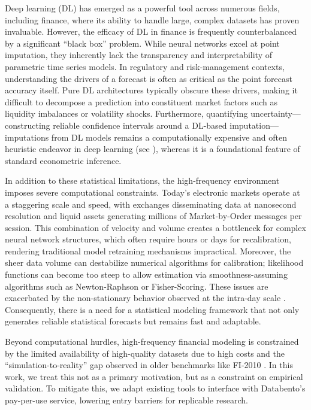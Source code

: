 \documentclass[10pt,a4paper,oneside]{article}
\providecommand{\DIFaddtex}[1]{{\protect\color{blue} \sf #1}} %
\providecommand{\DIFdeltex}[1]{{\protect\color{red} \scriptsize #1}} %
\providecommand{\DIFaddbegin}{} %
\providecommand{\DIFaddend}{} %
\providecommand{\DIFdelbegin}{} %
\providecommand{\DIFdelend}{} %
\providecommand{\DIFadd}[1]{\texorpdfstring{\DIFaddtex{#1}}{#1}} %
\providecommand{\DIFdel}[1]{\texorpdfstring{\DIFdeltex{#1}}{}} %
\newcommand{\DIFscaledelfig}{0.5}
\newlength{\DIFdelgraphicswidth} %
\newlength{\DIFdelgraphicsheight} %
\newcommand{\DIFaddincludegraphics}[2][]{{\color{blue}\fbox{\DIFOincludegraphics[#1]{#2}}}} %
\newcommand{\DIFdelincludegraphics}[2][]{%
\sbox{\DIFdelgraphicsbox}{\DIFOincludegraphics[#1]{#2}}%
\settoboxwidth{\DIFdelgraphicswidth}{\DIFdelgraphicsbox} %
\settoboxtotalheight{\DIFdelgraphicsheight}{\DIFdelgraphicsbox} %
\scalebox{\DIFscaledelfig}{%
\parbox[b]{\DIFdelgraphicswidth}{\usebox{\DIFdelgraphicsbox}\\[-\baselineskip] \rule{\DIFdelgraphicswidth}{0em}}\llap{\resizebox{\DIFdelgraphicswidth}{\DIFdelgraphicsheight}{%
\setlength{\unitlength}{\DIFdelgraphicswidth}%
\begin{picture}(1,1)%
\thicklines\linethickness{2pt} %
{\color[rgb]{1,0,0}\put(0,0){\framebox(1,1){}}}%
{\color[rgb]{1,0,0}\put(0,0){\line( 1,1){1}}}%
{\color[rgb]{1,0,0}\put(0,1){\line(1,-1){1}}}%
\end{picture}%
}\hspace*{3pt}}} %
} %
\DeclareRobustCommand{\DIFaddbegin}{\DIFOaddbegin \let\includegraphics\DIFaddincludegraphics} %
\DeclareRobustCommand{\DIFaddend}{\DIFOaddend \let\includegraphics\DIFOincludegraphics} %
\DeclareRobustCommand{\DIFdelbegin}{\DIFOdelbegin \let\includegraphics\DIFdelincludegraphics} %
\DeclareRobustCommand{\DIFdelend}{\DIFOaddend \let\includegraphics\DIFOincludegraphics} %
\begin{document}
Deep learning (DL) has emerged as a powerful tool across numerous fields, including finance, where its ability to handle large, complex datasets has proven invaluable. However, the efficacy of DL in finance is frequently counterbalanced by a significant ``black box'' problem. While neural networks excel at point imputation, they inherently lack the transparency and interpretability of parametric time series models. In regulatory and risk-management contexts, understanding the drivers of a forecast is often as critical as the point forecast accuracy itself. Pure DL architectures typically obscure these drivers, making it difficult to decompose a prediction into constituent market factors such as liquidity imbalances or volatility shocks. Furthermore, quantifying uncertainty—constructing reliable confidence intervals around \DIFdelbegin \DIFdel{a DL-based imputation—}\DIFdelend \DIFaddbegin \DIFadd{imputations from DL models }\DIFaddend remains a computationally expensive and often heuristic endeavor in deep learning (see \cite{barber2023conformalpredictionexchangeability}), whereas it is a foundational feature of standard econometric inference.

In addition to these statistical limitations, the high-frequency environment imposes severe computational constraints. Today's electronic markets operate at a staggering scale and speed, with exchanges disseminating data at nanosecond resolution and liquid assets generating millions of Market-by-Order messages per session. This combination of velocity and volume creates a bottleneck for complex neural network structures, which often require hours or days for recalibration, rendering traditional model retraining mechanisms impractical. Moreover, the sheer data volume can destabilize numerical algorithms for calibration; likelihood functions can become too steep to allow estimation via smoothness-assuming algorithms such as Newton-Raphson or Fisher-Scoring. These issues are exacerbated by the non-stationary behavior observed at the intra-day scale \cite{dutta2023review, Vyetrenko2019GetRR}. Consequently, there is a need for a statistical modeling framework that not only generates reliable statistical forecasts but remains fast and adaptable.

Beyond computational hurdles, high-frequency financial modeling is constrained by the limited availability of high-quality datasets due to high costs \cite{KISSELL201447} and the ``simulation-to-reality'' gap observed in older benchmarks like FI-2010 \cite{prata2024lob}. In this work, we treat this not as a primary motivation, but as a constraint on empirical validation. To mitigate this, we adapt existing tools to interface with Databento's pay-per-use service, lowering entry barriers for replicable research.
\end{document}
